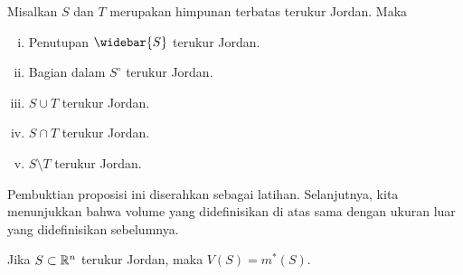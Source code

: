\begin{prop} \label{prop:jordanmeas}
Misalkan $S$ dan $T$ merupakan himpunan terbatas terukur Jordan. Maka
\begin{enumerate}[(i)]
\item Penutupan $\widebar{S}$ terukur Jordan.
\item Bagian dalam $S^\circ$ terukur Jordan.
\item $S \cup T$ terukur Jordan.
\item $S \cap T$ terukur Jordan.
\item $S \setminus T$ terukur Jordan.
\end{enumerate}
\end{prop}

Pembuktian proposisi ini diserahkan sebagai latihan.
Selanjutnya, kita menunjukkan bahwa volume yang didefinisikan di atas sama
dengan ukuran luar yang didefinisikan sebelumnya.

\begin{prop}
Jika $S \subset {\mathbb{R}}^n$ terukur Jordan, maka $V(S) = m^*(S)$.
\end{prop}

